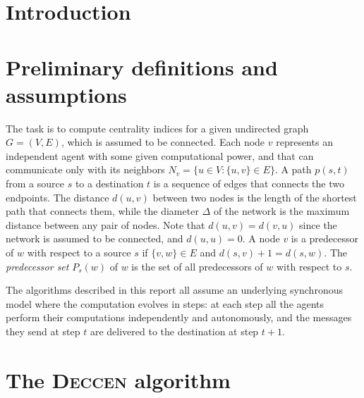 
\newcommand{\deccen}{\textsc{Deccen}}
\newcommand{\mdisc}{\textnormal{\textsf{{\footnotesize DIS\-CO\-VE\-RY}}}}
\newcommand{\mdiscargs}[3]{\mdisc$\langle #1,#2,#3, \sigma_{#1 #2} \rangle$}
\newcommand{\mrep}{\textnormal{\textsf{{\footnotesize REPORT}}}}
\newcommand{\mrepargs}[2]{\mrep$\langle #1,#2, \delta(#1|#2), \sigma(#1|#2), \sigma_{#1 #2} \rangle$}
\newcommand{\mrepleaf}[2]{\mrep$\langle #1,#2, 0, 0, \sigma_{#1 #2} \rangle$}

\newcommand{\swait}[1]{\textnormal{\textsf{{\footnotesize WAITING}}}$(#1)$}
\newcommand{\sact}[1]{\textnormal{\textsf{{\footnotesize ACTIVE}}}$(#1)$}
\newcommand{\scomp}[1]{\textnormal{\textsf{{\footnotesize COMPLETED}}}$(#1)$}


\section{Introduction}

\section{Preliminary definitions and assumptions}

The task is to compute centrality indices for a given undirected graph $G = (V,E)$, which is assumed to be connected. Each node $v$ represents an independent agent with some given computational power, and that can communicate only with its neighbors $N_v = \{u \in V : \{u,v\} \in E\}$. A path $p(s,t)$ from a source $s$ to a destination $t$ is a sequence of edges that connects the two endpoints. The distance $d(u,v)$ between two nodes is the length of the shortest path that connects them, while the diameter $\Delta$ of the network is the maximum distance between any pair of nodes. Note that $d(u,v) = d(v,u)$ since the network is assumed to be connected, and $d(u,u) = 0$. A node $v$ is a predecessor of $w$ with respect to a source $s$ if $\{v,w\} \in E$ and $d(s,v) +1 = d(s,w)$. The \emph{predecessor set} $P_s(w)$ of $w$ is the set of all predecessors of $w$ with respect to $s$.

The algorithms described in this report all assume an underlying synchronous model where the computation evolves in steps: at each step all the agents perform their computations independently and autonomously, and the messages they send at step $t$ are delivered to the destination at step $t+1$.

\section{The \deccen{} algorithm}


